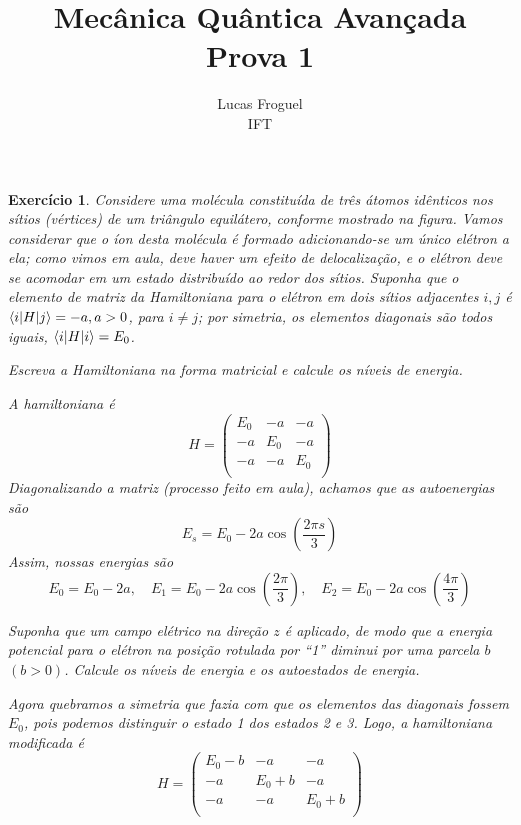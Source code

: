 \documentclass[12pt]{article}
\title{Mecânica Quântica Avançada \\ Prova 1}
\author{Lucas Froguel \\ IFT}
\date{}
\def\be{\begin{equation}}
\def\ee{\end{equation}}
\def\f{\frac}
\def\l{\left}
\def\r{\right}
\newtheorem{exercise}{Exercício}
\begin{document}
	\maketitle
	\listoftheorems[title={Prova 1}]

	\begin{exercise}
		Considere uma molécula constituída de três átomos idênticos nos
		sítios (vértices) de um triângulo equilátero, conforme mostrado na figura. Vamos considerar que o íon desta molécula é formado adicionando-se um único elétron a ela; como vimos em aula, deve haver um efeito de delocalização, e o elétron deve se acomodar em um estado distribuído ao redor dos sítios. Suponha que o elemento de matriz da Hamiltoniana para o elétron em dois sítios adjacentes $i, j$ é $\braket{i|H|j} = -a, a>0$, para $i\not=j$; por simetria, os elementos diagonais são todos	iguais, $\braket{i|H|i}=E_0$.
		\begin{exercises}
			\item Escreva a Hamiltoniana na forma matricial e calcule os níveis de energia.
			\begin{multianswer}
				A hamiltoniana é
				\be
					H = 
					\begin{pmatrix}
						E_0 & -a & -a \\
						-a & E_0 & -a \\
						-a & -a & E_0 \\
					\end{pmatrix}
				\ee
				Diagonalizando a matriz (processo feito em aula), achamos que as autoenergias são
				\be
					E_s = E_0 -2a\cos\l( \f{2\pi s}{3}\r)
				\ee
				Assim, nossas energias são
				\be
					E_0 = E_0 - 2a, \quad E_1 = E_0 -2a\cos\l(\f{2\pi}{3}\r), \quad E_2 = E_0 -2a\cos\l(\f{4\pi}{3}\r)
				\ee
			\end{multianswer}
			
			\item Suponha que um campo elétrico na direção $z$ é aplicado, de modo que a energia potencial para o elétron na posição rotulada por “1” diminui por uma parcela $b$
			$(b>0)$. Calcule os níveis de energia e os autoestados de energia.
			\begin{multianswer}
				Agora quebramos a simetria que fazia com que os elementos das diagonais fossem $E_0$, pois podemos distinguir o estado 1 dos estados 2 e 3. Logo, a hamiltoniana modificada é 
				\be
				H = 
				\begin{pmatrix}
					E_0 - b & -a & -a \\
					-a & E_0 + b & -a \\
					-a & -a & E_0 + b \\
				\end{pmatrix}
				\ee
			\end{multianswer}
			
		\end{exercises}
	\end{exercise}
\end{document}

